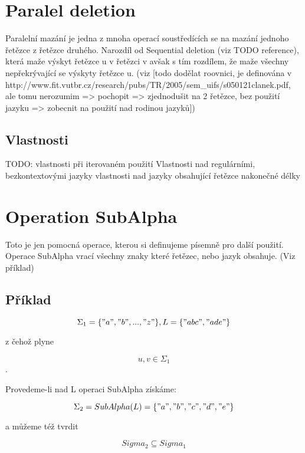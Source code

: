 \section{Paralel deletion}
Paralelní mazání je jedna z mnoha operací soustředících se na mazání jednoho řetězce z řetězce druhého. Narozdíl od Sequential deletion (viz TODO reference), která maže výskyt řetězce u v řetězci v avšak s tím rozdílem, že maže všechny nepřekrývající se výskyty řetězce u. (viz [todo dodělat roovnici, je definována v http://www.fit.vutbr.cz/research/pubs/TR/2005/sem\_uifs/s050121clanek.pdf, ale tomu nerozumim => pochopit => zjednodušit na 2 řetězce, bez použití jazyku => zobecnit na použití nad rodinou jazyků]) 

\subsection{Vlastnosti}
TODO: vlastnosti při iterovaném použití
Vlastnosti nad regulárními, bezkontextovými jazyky
vlastnosti nad jazyky obsahující řetězce nakonečné délky

\section{Operation SubAlpha}
Toto je jen pomocná operace, kterou si definujeme písemně pro další použití. Operace SubAlpha vrací všechny znaky které řetězec, nebo jazyk obsahuje. (Viz příklad)

\subsection{Příklad}
$$\Sigma_{1} = \{"a", "b", ..., "z"\}, L = \{"abc", "ade"\}$$

z čehož plyne 

$$u,v \in \Sigma_{1}$$. 

Provedeme-li nad L operaci SubAlpha získáme: 

$$\Sigma_{2} = SubAlpha(L) = \{"a", "b", "c", "d", "e"\}$$

a můžeme též tvrdit 

$$Sigma_{2} \subseteq Sigma_{1}$$

